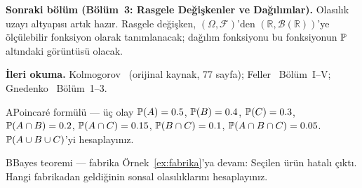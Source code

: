 \begin{kopru}
\textbf{Sonraki bölüm (Bölüm~3: Rasgele Değişkenler ve Dağılımlar).}
Olasılık uzayı altyapısı artık hazır. Rasgele değişken, $(\Omega,\mathcal{F})$'den
$(\mathbb{R},\mathcal{B}(\mathbb{R}))$'ye ölçülebilir fonksiyon olarak
tanımlanacak; dağılım fonksiyonu bu fonksiyonun $\mathbb{P}$ altındaki görüntüsü
olacak.

\medskip

\textbf{İleri okuma.}
Kolmogorov~\cite{kolmogorov1933} (orijinal kaynak, 77 sayfa);
Feller~\cite{feller1968vol1} Bölüm~I--V;
Gnedenko~\cite{gnedenko1962} Bölüm~1--3.
\end{kopru}



\cozumlualistirmalar

\begin{alistirma}[Al.2.1]{A}{Poincaré formülü --- üç olay}
$\mathbb{P}(A) = 0.5$, $\mathbb{P}(B) = 0.4$, $\mathbb{P}(C) = 0.3$,
$\mathbb{P}(A \cap B) = 0.2$, $\mathbb{P}(A \cap C) = 0.15$,
$\mathbb{P}(B \cap C) = 0.1$, $\mathbb{P}(A \cap B \cap C) = 0.05$.
$\mathbb{P}(A \cup B \cup C)$'yi hesaplayınız.
\end{alistirma}

\begin{alistirma}[Al.2.2]{B}{Bayes teoremi --- fabrika}
Örnek~\ref{ex:fabrika}'ya devam: Seçilen ürün hatalı çıktı.
Hangi fabrikadan geldiğinin sonsal olasılıklarını hesaplayınız.
\end{alistirma}

